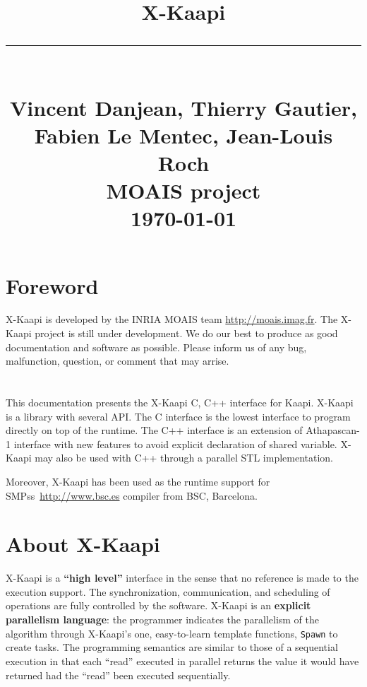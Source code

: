 \documentclass{report}[12pt]
\newcommand{\kaapi}{\textsc{X}-Kaapi\xspace}
\begin{document}
\title{\hfill{\textbf{\kaapi}}
\rule{\textwidth}{1.5mm}\\[1mm]%
\hfill{\normalsize Vincent Danjean, Thierry Gautier, Fabien Le Mentec, Jean-Louis Roch\\
\hfill MOAIS project
} \\[-3mm]%
\hfill{\normalsize \today}
}
\date{}
\maketitle
\tableofcontents
\newpage

\chapter*{Foreword}
\kaapi is developed by the INRIA MOAIS team \url{http://moais.imag.fr}.
 The \kaapi project is still under development.  We do our best to produce as good documentation and  software as possible.  
 Please inform us of any bug, malfunction, question, or comment that may arrise. \\ 
~\\
~\\
This documentation presents the \kaapi C, C++ interface for Kaapi. \kaapi is a library with several API. The C interface is the lowest interface to program directly on top of the runtime. The C++ interface is an extension of Athapascan-1 interface with new features to avoid explicit declaration of shared variable. \kaapi may also be used with C++ through a parallel STL implementation.

Moreover, \kaapi has been used as the runtime support for SMPss~\url{http://www.bsc.es} compiler from BSC, Barcelona.

\newpage

\chapter*{About \kaapi}

\kaapi  is a \textbf{``high level''}  interface in the sense that no reference is made to the execution support.  
The synchronization, communication, and scheduling of operations are fully controlled by the software. 
   \kaapi is an  \textbf{explicit parallelism language}: the programmer indicates the parallelism of the algorithm through \kaapi's one, easy-to-learn  template functions, \texttt{Spawn} to create tasks.   The programming semantics are similar to those of a sequential 
 execution in that each ``read'' executed in parallel returns the value it would have returned had the ``read'' been executed  sequentially. 
 
\end{document}
